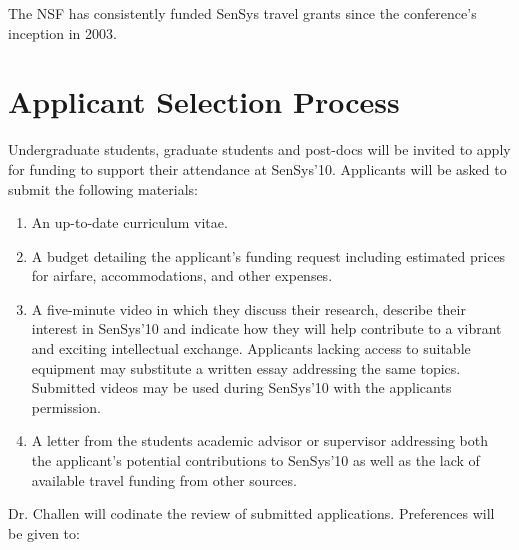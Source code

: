 \documentclass[11pt,letterpaper]{article}
\begin{document}
The NSF has consistently funded SenSys travel grants since the
conference's inception in 2003. 

\vfill\eject
\section*{Applicant Selection Process}

Undergraduate students, graduate students and post-docs will be invited to
apply for funding to support their attendance at SenSys'10.
Applicants will be asked to submit the following materials:

\begin{enumerate}

\item An up-to-date curriculum vitae.

\item A budget detailing the applicant's funding request including estimated
prices for airfare, accommodations, and other expenses.

\item A five-minute video in which they discuss their research, describe
their interest in SenSys'10 and indicate how they will help contribute to a
vibrant and exciting intellectual exchange. Applicants lacking access to
suitable equipment may substitute a written essay addressing the same topics.
Submitted videos may be used during SenSys'10 with the applicants permission.

\item A letter from the students academic advisor or supervisor addressing
both the applicant's potential contributions to SenSys'10 as well as the lack
of available travel funding from other sources.

\end{enumerate}

Dr. Challen will codinate the review of submitted applications.
Preferences will be given to:
\end{document}
